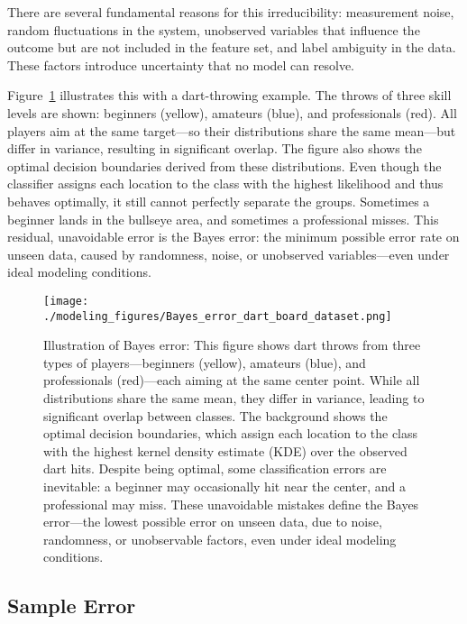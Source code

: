 \documentclass[12pt,openany]{book}
\begin{document}
There are several fundamental reasons for this irreducibility: measurement noise, random fluctuations in the system, unobserved variables that influence the outcome but are not included in the feature set, and label ambiguity in the data. These factors introduce uncertainty that no model can resolve. \newline

Figure~\ref{fig:bayes-error-darts} illustrates this with a dart-throwing example. The throws of three skill levels are shown: beginners (yellow), amateurs (blue), and professionals (red). All players aim at the same target—so their distributions share the same mean—but differ in variance, resulting in significant overlap. The figure also shows the optimal decision boundaries derived from these distributions. Even though the classifier assigns each location to the class with the highest likelihood and thus behaves optimally, it still cannot perfectly separate the groups. Sometimes a beginner lands in the bullseye area, and sometimes a professional misses. This residual, unavoidable error is the Bayes error: the minimum possible error rate on unseen data, caused by randomness, noise, or unobserved variables—even under ideal modeling conditions.

\begin{figure}[H]
    \centering
    \texttt{[image: ./modeling\_figures/Bayes\_error\_dart\_board\_dataset.png]}
    \caption{
    Illustration of Bayes error: This figure shows dart throws from three types of players—beginners (yellow), amateurs (blue), and professionals (red)—each aiming at the same center point. While all distributions share the same mean, they differ in variance, leading to significant overlap between classes. The background shows the optimal decision boundaries, which assign each location to the class with the highest kernel density estimate (KDE) over the observed dart hits. Despite being optimal, some classification errors are inevitable: a beginner may occasionally hit near the center, and a professional may miss. These unavoidable mistakes define the Bayes error—the lowest possible error on unseen data, due to noise, randomness, or unobservable factors, even under ideal modeling conditions.
    }
    \label{fig:bayes-error-darts}
\end{figure}


\subsection{Sample Error}
\end{document}
